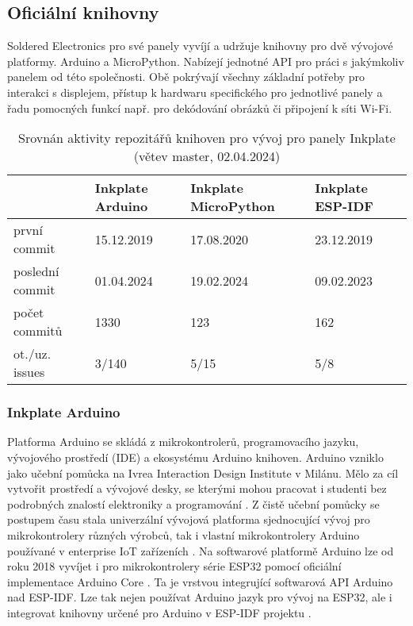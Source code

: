 \subsection{Oficiální knihovny}
Soldered Electronics pro své panely vyvíjí a udržuje knihovny pro dvě vývojové platformy. Arduino a MicroPython. Nabízejí jednotné API pro práci s jakýmkoliv panelem od této společnosti. Obě pokrývají všechny základní potřeby pro interakci s displejem, přístup k hardwaru specifického pro jednotlivé panely a řadu pomocných funkcí např. pro dekódování obrázků či připojení k síti Wi-Fi.

\begin{table}[h]
\centering
\caption{Srovnán aktivity repozitářů knihoven pro vývoj pro panely Inkplate (větev master, 02.04.2024)}
\label{tab:inkplate-library-comparison}
\begin{tabular}{llll}
\multicolumn{1}{c}{}
    & Inkplate Arduino\cite{SolderedElectronicsInkplateArduinolibrary2024}
    & Inkplate MicroPython\cite{SolderedElectronicsInkplatemicropythonMicropython}
    & Inkplate ESP-IDF\cite{turcotteTurgu1ESPIDFInkPlate2024} \\ \hline
první commit             & 15.12.2019 & 17.08.2020  & 23.12.2019 \\
poslední commit          & 01.04.2024 & 19.02.2024  & 09.02.2023 \\
počet commitů            & 1330       & 123         & 162        \\
ot./uz. issues           & 3/140      & 5/15        & 5/8        \\ \hline
\end{tabular}
\end{table}

\subsubsection{Inkplate Arduino}
Platforma Arduino se skládá z mikrokontrolerů, programovacího jazyku, vývojového prostředí (IDE) a ekosystému Arduino knihoven. Arduino vzniklo jako učební pomůcka na Ivrea Interaction Design Institute v Milánu. Mělo za cíl vytvořit prostředí a vývojové desky, se kterými mohou pracovat i studenti bez podrobných znalostí elektroniky a programování \cite{WhatArduino}. Z čistě učební pomůcky se postupem času stala univerzální vývojová platforma sjednocující vývoj pro mikrokontrolery různých výrobců, tak i vlastní mikrokontrolery Arduino používané v enterprise IoT zařízeních \cite{Arduino}. Na softwarové platformě Arduino lze od roku 2018 vyvíjet i pro mikrokontrolery série ESP32 pomocí oficiální implementace Arduino Core \cite{ReleasesEspressifArduinoesp32}. Ta je vrstvou integrující softwarová API Arduino nad ESP-IDF. Lze tak nejen používat Arduino jazyk pro vývoj na ESP32, ale i integrovat knihovny určené pro Arduino v ESP-IDF projektu \cite{espressifsystemsArduinoESPIDFComponent}.


